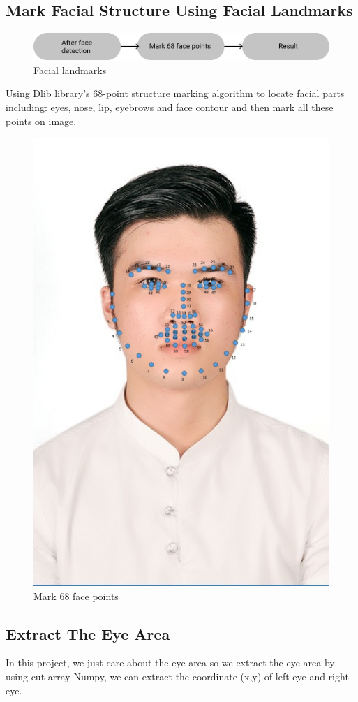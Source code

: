     \subsection{Mark Facial Structure Using Facial Landmarks}
        \begin{figure}[H]
            \centering
            \includegraphics[width=0.6\linewidth]{img/Facial.png}
            \caption{Facial landmarks}
        \end{figure}
        Using Dlib library's 68-point structure marking algorithm to locate facial parts including: eyes, nose, lip, eyebrows and face contour and 
        then mark all these points on image.
        \begin{figure}[H]
            \centering
            \includegraphics[width=0.6\linewidth]{img/testing.png}
            \caption{Mark 68 face points}
        \end{figure}

    \subsection{Extract The Eye Area}
        In this project, we just care about the eye area so we extract the eye area by using cut array Numpy, we can extract the coordinate (x,y) 
        of left eye and right eye.

